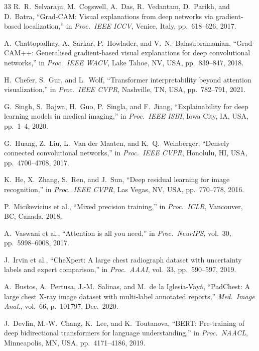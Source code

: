 \documentclass[conference]{IEEEtran}
\begin{document}
\begin{thebibliography}{33}
R.~R.~Selvaraju, M.~Cogswell, A.~Das, R.~Vedantam, D.~Parikh, and
D.~Batra, ``Grad-CAM: Visual explanations from deep networks via
gradient-based localization,''
in \textit{Proc.\ IEEE ICCV}, Venice, Italy,
pp.~618--626, 2017.

A.~Chattopadhay, A.~Sarkar, P.~Howlader, and
V.~N.~Balasubramanian, ``Grad-CAM++: Generalised gradient-based visual
explanations for deep convolutional networks,''
in \textit{Proc.\ IEEE WACV}, Lake Tahoe, NV, USA,
pp.~839--847, 2018.

H.~Chefer, S.~Gur, and L.~Wolf, ``Transformer interpretability beyond
attention visualization,''
in \textit{Proc.\ IEEE CVPR}, Nashville, TN, USA,
pp.~782--791, 2021.

G.~Singh, S.~Bajwa, H.~Guo, P.~Singla, and F.~Jiang,
``Explainability for deep learning models in medical imaging,''
in \textit{Proc.\ IEEE ISBI}, Iowa City, IA, USA,
pp.~1--4, 2020.

G.~Huang, Z.~Liu, L.~Van der Maaten, and K.~Q.~Weinberger,
``Densely connected convolutional networks,''
in \textit{Proc.\ IEEE CVPR}, Honolulu, HI, USA,
pp.~4700--4708, 2017.

K.~He, X.~Zhang, S.~Ren, and J.~Sun,
``Deep residual learning for image recognition,''
in \textit{Proc.\ IEEE CVPR}, Las Vegas, NV, USA,
pp.~770--778, 2016.

P.~Micikevicius et al., ``Mixed precision training,''
in \textit{Proc.\ ICLR}, Vancouver, BC, Canada, 2018.

A.~Vaswani et al., ``Attention is all you need,''
in \textit{Proc.\ NeurIPS}, vol.~30, pp.~5998--6008, 2017.

J.~Irvin et al., ``CheXpert: A large chest radiograph dataset with
uncertainty labels and expert comparison,''
in \textit{Proc.\ AAAI}, vol.~33, pp.~590--597, 2019.

A.~Bustos, A.~Pertusa, J.-M.~Salinas, and M.~de la Iglesia-Vay\'{a},
``PadChest: A large chest X-ray image dataset with multi-label
annotated reports,''
\textit{Med.\ Image Anal.}, vol.~66, p.~101797, Dec.~2020.

J.~Devlin, M.-W.~Chang, K.~Lee, and K.~Toutanova,
``BERT: Pre-training of deep bidirectional transformers for language
understanding,''
in \textit{Proc.\ NAACL}, Minneapolis, MN, USA,
pp.~4171--4186, 2019.

\end{thebibliography}
\end{document}
